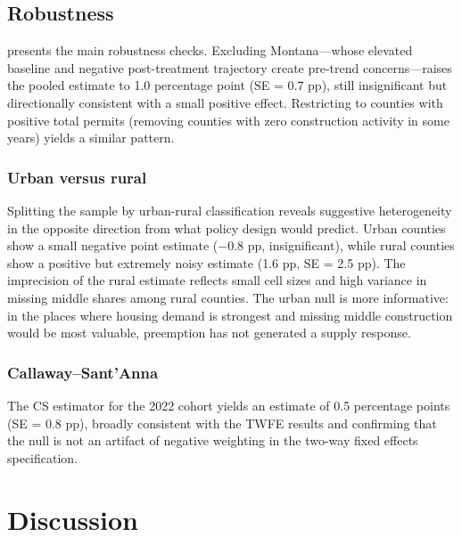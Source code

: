 \documentclass[12pt]{article}
\begin{document}


\subsection{Robustness}

 presents the main robustness checks. Excluding Montana---whose elevated baseline and negative post-treatment trajectory create pre-trend concerns---raises the pooled estimate to 1.0 percentage point (SE = 0.7 pp), still insignificant but directionally consistent with a small positive effect. Restricting to counties with positive total permits (removing counties with zero construction activity in some years) yields a similar pattern.

\subsubsection*{Urban versus rural} Splitting the sample by urban-rural classification reveals suggestive heterogeneity in the opposite direction from what policy design would predict. Urban counties show a small negative point estimate ($-0.8$ pp, insignificant), while rural counties show a positive but extremely noisy estimate (1.6 pp, SE = 2.5 pp). The imprecision of the rural estimate reflects small cell sizes and high variance in missing middle shares among rural counties. The urban null is more informative: in the places where housing demand is strongest and missing middle construction would be most valuable, preemption has not generated a supply response.

\subsubsection*{Callaway--Sant'Anna} The CS estimator for the 2022 cohort yields an estimate of 0.5 percentage points (SE = 0.8 pp), broadly consistent with the TWFE results and confirming that the null is not an artifact of negative weighting in the two-way fixed effects specification.




\section{Discussion}
\label{sec:discussion}
\end{document}

